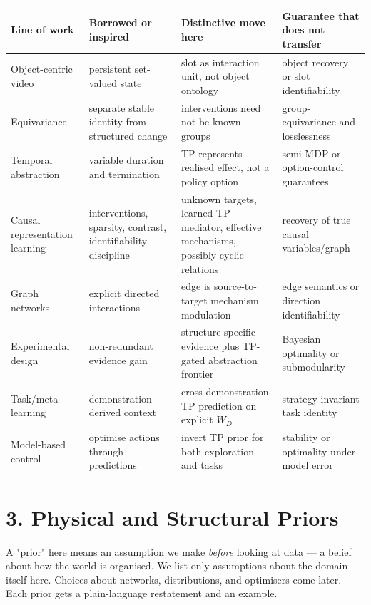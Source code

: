 \documentclass[11pt]{article}
\newenvironment{plainword}{%
  \par\medskip\noindent\begin{minipage}{\textwidth}%
  \color{gray!75!black}\small\itshape
}{%
  \end{minipage}\par\medskip}
\begin{document}
\begin{center}
\small
\begin{tabularx}{\textwidth}{@{}p{}XXX@{}}
\toprule
Line of work & Borrowed or inspired & Distinctive move here & Guarantee that does not transfer \\
\midrule
Object-centric video & persistent set-valued state & slot as interaction unit, not object ontology & object recovery or slot identifiability \\
Equivariance & separate stable identity from structured change & interventions need not be known groups & group-equivariance and losslessness \\
Temporal abstraction & variable duration and termination & TP represents realised effect, not a policy option & semi-MDP or option-control guarantees \\
Causal representation learning & interventions, sparsity, contrast, identifiability discipline & unknown targets, learned TP mediator, effective mechanisms, possibly cyclic relations & recovery of true causal variables/graph \\
Graph networks & explicit directed interactions & edge is source-to-target mechanism modulation & edge semantics or direction identifiability \\
Experimental design & non-redundant evidence gain & structure-specific evidence plus TP-gated abstraction frontier & Bayesian optimality or submodularity \\
Task/meta learning & demonstration-derived context & cross-demonstration TP prediction on explicit $W_D$ & strategy-invariant task identity \\
Model-based control & optimise actions through predictions & invert TP prior for both exploration and tasks & stability or optimality under model error \\
\bottomrule
\end{tabularx}
\end{center}

\section*{3. Physical and Structural Priors}

\begin{plainword}
A "prior" here means an assumption we make \emph{before} looking at data --- a belief about how the world is organised. We list only
assumptions about the domain itself here. Choices about networks, distributions, and optimisers come later. Each prior gets a
plain-language restatement and an example.
\end{plainword}
\end{document}
